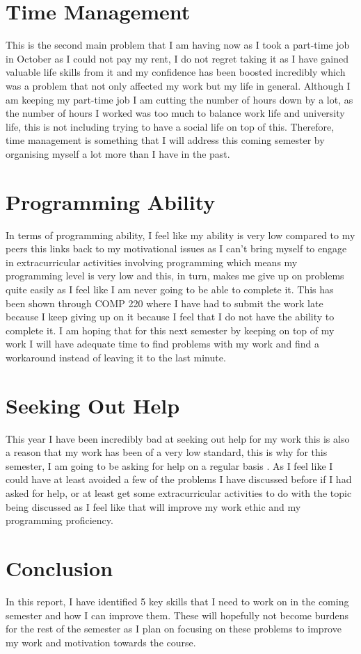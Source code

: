 \documentclass[11pt]{scrartcl}
\begin{document}
\section {Time Management}
This is the second main problem that I am having now as I took a part-time job in October as I could not pay my rent, I do not regret taking it as I have gained valuable life skills from it and my confidence has been boosted incredibly which was a problem that not only affected my work but my life in general. Although I am keeping my part-time job I am cutting the number of hours down by a lot, as the number of hours I worked was too much to balance work life and university life, this is not including trying to have a social life on top of this. Therefore, time management is something that I will address this coming semester by organising myself a lot more than I have in the past.

\section {Programming Ability}
In terms of programming ability, I feel like my ability is very low compared to my peers this links back to my motivational issues as I can't bring myself to engage in extracurricular activities involving programming which means my programming level is very low and this, in turn, makes me give up on problems quite easily as I feel like I am never going to be able to complete it. This has been shown through COMP 220 where I have had to submit the work late because I keep giving up on it because I feel that I do not have the ability to complete it. I am hoping that for this next semester by keeping on top of my work I will have adequate time to find problems with my work and find a workaround instead of leaving it to the last minute.

\section {Seeking Out Help}
This year I have been incredibly bad at seeking out help for my work this is also a reason that my work has been of a very low standard, this is why for this semester, I am going to be asking for help on a regular basis . As I feel like I could have at least avoided a few of the problems I have discussed before if I had asked for help, or at least get some extracurricular activities to do with the topic being discussed as I feel like that will improve my work ethic and my programming proficiency.

\section*{Conclusion}
In this report, I have identified 5 key skills that I need to work on in the coming semester and how I can improve them. These will hopefully not become burdens for the rest of the semester as I plan on focusing on these problems to improve my work and motivation towards the course.






\end{document}
